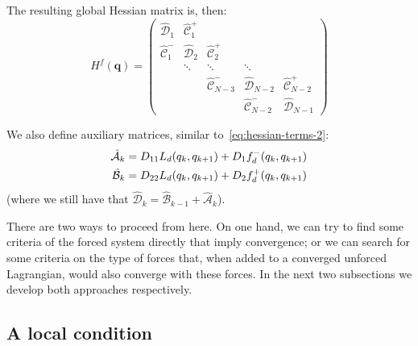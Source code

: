 The resulting global Hessian matrix is, then:
\begin{equation}
	H^f (\mathbf{q}) = \begin{pmatrix}
		\hat{\mathcal{D}}_1     & \hat{\mathcal{C}}^+_{1} &                             &                             &                             \\
		\hat{\mathcal{C}}^-_{1} & \hat{\mathcal{D}}_2     & \hat{\mathcal{C}}^+_{2}     &                             &                             \\
		                        & \ddots                  & \ddots                      & \ddots                      &                             \\
		                        &                         & \hat{\mathcal{C}}^-_{N - 3} & \hat{\mathcal{D}}_{N - 2}   & \hat{\mathcal{C}}^+_{N - 2} \\
		                        &                         &                             & \hat{\mathcal{C}}^-_{N - 2} & \hat{\mathcal{D}}_{N - 1}
	\end{pmatrix}
	\label{eq:hessian-matrix-forced}
\end{equation}

We also define auxiliary matrices, similar to~\eqref{eq:hessian-terms-2}:
\begin{equation}
	\begin{aligned}
		\hat{\mathcal{A}}_k & = D_{11} L_d(q_k, q_{k+1}) + D_{1} f_d^-(q_k, q_{k+1}) \\
		\hat{\mathcal{B}}_k & = D_{22} L_d(q_k, q_{k+1}) + D_{2} f_d^+(q_k, q_{k+1}) \\
	\end{aligned}
	\label{eq:hessian-terms-forced-2}
\end{equation}
(where we still have that $\hat{\mathcal{D}}_k = \hat{\mathcal{B}}_{k-1} + \hat{\mathcal{A}}_k$).

There are two ways to proceed from here. On one hand, we can try to find some criteria of the forced system directly that imply convergence; or we can search for some criteria on the type of forces that, when added to a converged unforced Lagrangian, would also converge with these forces. In the next two subsections we develop both approaches respectively.

\subsection{A local condition}\label{sec:forced-local-condition}

